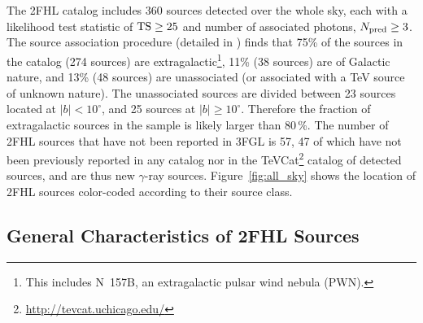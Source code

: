 The 2FHL catalog includes 360 sources detected over the whole sky, each with a likelihood test statistic of ${\rm TS}\geq 25$ and number of associated photons, $N_{\rm pred}\geq 3$. 
The source association procedure (detailed in \cite{2FHL}) finds that 75\% of the sources in the catalog (274 sources) are extragalactic\footnote{This includes N~157B, an extragalactic pulsar wind nebula (PWN).}, 11\% (38 sources) are of Galactic nature, and 13\% (48 sources) are unassociated (or associated with a TeV source of unknown nature). The unassociated sources are divided between 23 sources located at $|b|<10^{\circ}$, and 25 sources at $|b|\geq 10^{\circ}$. Therefore the fraction of extragalactic sources in the sample is likely larger than 80\,\%.
{ The number of 2FHL sources that have not been reported in 3FGL is 57, 47 of which have not been previously reported in any \lat{} catalog nor in the TeVCat\footnote{\url{http://tevcat.uchicago.edu/}} catalog of \tev{} detected sources, and are thus new $\gamma$-ray sources.}
Figure~\ref{fig:all_sky} shows the location of 2FHL sources color-coded according to their source class. 

%
%
\subsection{General Characteristics of 2FHL Sources}\label{2fhl:General}

